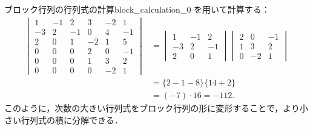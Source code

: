 \begin{example}{ブロック行列の行列式の計算}{block_calculation_0}
  を用いて計算する：
  \begin{align*}
    \begin{vmatrix}
      1 & -1 &  2 &  3 & -2 &  1 \\
     -3 &  2 & -1 &  0 &  4 & -1 \\
      2 &  0 &  1 & -2 &  1 &  5 \\
      0 &  0 &  0 &  2 &  0 & -1 \\
      0 &  0 &  0 &  1 &  3 &  2 \\
      0 &  0 &  0 &  0 & -2 &  1
    \end{vmatrix}
    &=
    \begin{vmatrix}
      1 & -1 &  2 \\
     -3 &  2 & -1 \\
      2 &  0 &  1
    \end{vmatrix}
    \begin{vmatrix}
      2 &  0 & -1 \\
      1 &  3 &  2 \\
      0 & -2 &  1
    \end{vmatrix} \\
    &=
    \{2-1-8\}\{14+2\} \\
    &=(-7)\cdot 16=-112.
  \end{align*}
  このように，次数の大きい行列式をブロック行列の形に変形することで，より小さい行列式の積に分解できる．
\end{example}


